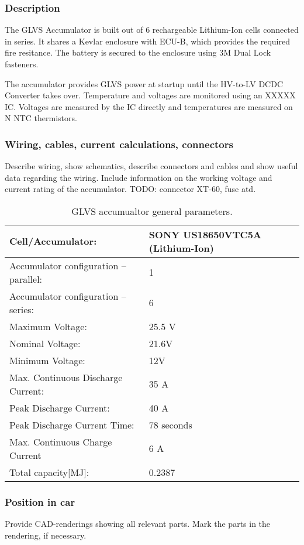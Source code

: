 \subsubsection{Description}

The GLVS Accumulator is built out of 6 rechargeable Lithium-Ion cells connected in series. It shares a Kevlar enclosure with ECU-B, which provides the required fire resitance. The battery is secured to the enclosure using 3M Dual Lock fasteners.

The accumulator provides GLVS power at startup until the HV-to-LV DCDC Converter takes over. Temperature and voltages are monitored using an XXXXX IC. Voltages are measured by the IC directly and temperatures are measured on N NTC thermistors.

\subsubsection{Wiring, cables, current calculations, connectors}
Describe wiring, show schematics, describe connectors and cables and show useful data regarding the wiring.  Include information on the working voltage and current rating of the accumulator.
TODO: connector XT-60, fuse atd.

\begin{table}[H]
	\centering
	\caption{GLVS accumualtor general parameters.}
	\begin{tabularx}{\textwidth}{|X|X|}\hline
		Cell/Accumulator: & SONY US18650VTC5A (Lithium-Ion)\\[\TableSize]\hline
		Accumulator configuration – parallel: & 1 \\[\TableSize]\hline
		Accumulator configuration – series: & 6 \\[\TableSize]\hline
		Maximum Voltage: & 25.5 V \\[\TableSize]\hline
		Nominal Voltage: & 21.6V \\[\TableSize]\hline
		Minimum Voltage: & 12V \\[\TableSize]\hline
		Max. Continuous Discharge Current: & 35 A \\[\TableSize]\hline
		Peak Discharge Current: & 40 A \\[\TableSize]\hline
		Peak Discharge Current Time: & 78 seconds \\[\TableSize]\hline
		Max. Continuous Charge Current & 6 A \\[\TableSize]\hline
		Total capacity[MJ]: & 0.2387 \\[\TableSize]\hline
	\end{tabularx}%
	\label{tab:LVbatt-general}%
\end{table}%

\subsubsection{Position in car}
Provide CAD-renderings showing all relevant parts. Mark the parts in the rendering, if necessary.
